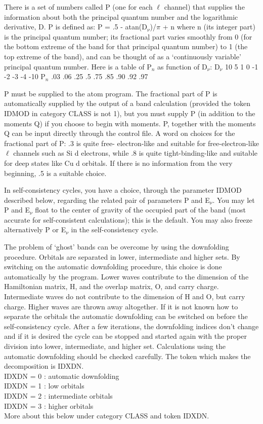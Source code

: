 \documentclass[aps,twocolumn,a4]{revtex4}
\begin{document}
There is a set of numbers called P (one for each $\ell $ channel) that
supplies the information about both the principal quantum number and the
logarithmic derivative, D. P is defined as:
P = .5 - atan(D$_\nu $)/$\pi $ + n where n (its integer part) is the
principal quantum number; its fractional part varies smoothly from 0
(for the bottom extreme of the band for that principal quantum number)
to 1 (the top extreme of the band), and can be thought of as a
`continuously variable' principal quantum number.  Here is a table of
P$_n$ as function of D$_\nu $: D$_\nu $ 10 5 1 0 -1 -2 -3 -4 -10 P$_n$
.03 .06 .25 .5 .75 .85 .90 .92 .97

P must be supplied to the atom program.  The fractional part of P is
automatically supplied by the output of a band calculation (provided
the token IDMOD in category CLASS is not 1),
but you must supply P (in addition to the moments Q) if
you choose to begin with moments.  P, together with the moments Q can be
input directly through the control file.  A word on choices for the
fractional part of P: .3 is quite free- electron-like and suitable for
free-electron-like $\ell $ channels such as Si d electrons, while .8 is
quite tight-binding-like and suitable for deep states like Cu d orbitals.
If there is no information from the very beginning, .5 is a suitable
choice.

In self-consistency cycles, you have a choice, through the parameter
IDMOD described below, regarding the related pair of parameters P and
E$_\nu $.  You may let P and E$_\nu $ float to the center of gravity
of the occupied part of the band (most accurate for self-consistent
calculations); this is the default.  You may also freeze alternatively P
or E$_\nu $ in the self-consistency cycle.

The problem of `ghost' bands can be overcome by using the downfolding
procedure.  Orbitals are separated in lower, intermediate and higher
sets. By switching on the automatic downfolding procedure,
this choice is done
automatically by the program.  Lower waves contribute to the dimension
of the Hamiltonian matrix, H, and the overlap matrix, O, and carry
charge.  Intermediate waves do not contribute to the dimension of H and
O, but carry charge.  Higher waves are thrown away altogether.  If it
is not known how to separate the orbitals the automatic downfolding can
be switched on before the self-consistency cycle.  After a few
iterations, the downfolding indices don't change and if it is desired
the cycle can be stopped and started again with the proper division into
lower, intermediate, and higher set.
Calculations using the automatic downfolding should be
checked carefully.  The token which makes the decomposition is
IDXDN.\\
IDXDN = 0 : automatic downfolding \\
IDXDN = 1 : low orbitals \\
IDXDN = 2 : intermediate orbitals \\
IDXDN = 3 : higher orbitals\\
More about this below under category CLASS and token IDXDN.
\end{document}
